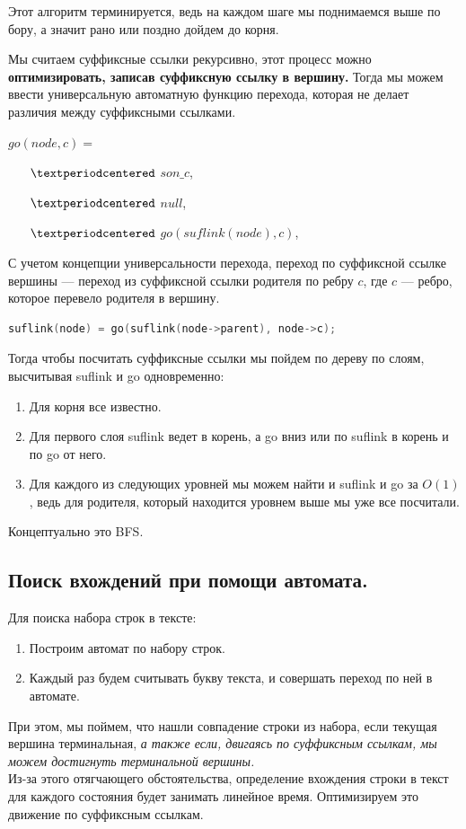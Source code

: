 Этот алгоритм терминируется, ведь на каждом шаге мы поднимаемся выше по бору, а значит рано или поздно дойдем до корня.

Мы считаем суффиксные ссылки рекурсивно, этот процесс можно \textbf{оптимизировать, записав суффиксную ссылку в вершину.}
Тогда мы можем ввести универсальную автоматную функцию перехода, которая не делает различия между суффиксными ссылками.

$go(node, c) = $
\begin{itemize}
    \item[$\textperiodcentered$] $son\_c$, 
    \item[$\textperiodcentered$] $null$, 
    \item[$\textperiodcentered$] $go(suflink(node), c)$, 
\end{itemize}

С учетом концепции универсальности перехода, переход по суффиксной ссылке вершины --- переход из суффиксной ссылки родителя по ребру $c$, где  $c$ --- ребро, которое перевело родителя в вершину.
\begin{lstlisting}[language = C++]
    suflink(node) = go(suflink(node->parent), node->c); 
\end{lstlisting}

Тогда чтобы посчитать суффиксные ссылки мы пойдем по дереву по слоям, высчитывая suflink и go одновременно:
\begin{enumerate}
    \item Для корня все известно.
    \item Для первого слоя suflink ведет в корень, а go вниз или по suflink в корень и по go от него.
    \item Для каждого из следующих уровней мы можем найти и suflink и go за $O(1)$, ведь для родителя, который находится уровнем выше мы уже все посчитали.
\end{enumerate}
Концептуально это BFS.

\subsection{Поиск вхождений при помощи автомата.}
Для поиска набора строк в тексте:
\begin{enumerate}
    \item Построим автомат по набору строк. 
    \item Каждый раз будем считывать букву текста, и совершать переход по ней в автомате.
\end{enumerate}
При этом, мы поймем, что нашли совпадение строки из набора, если текущая вершина терминальная, \textit{а также если, двигаясь по суффиксным ссылкам, мы можем достигнуть терминальной вершины.} \\
Из-за этого отягчающего обстоятельства, определение вхождения строки в текст для каждого состояния будет занимать линейное время.
Оптимизируем это движение по суффиксным ссылкам.

